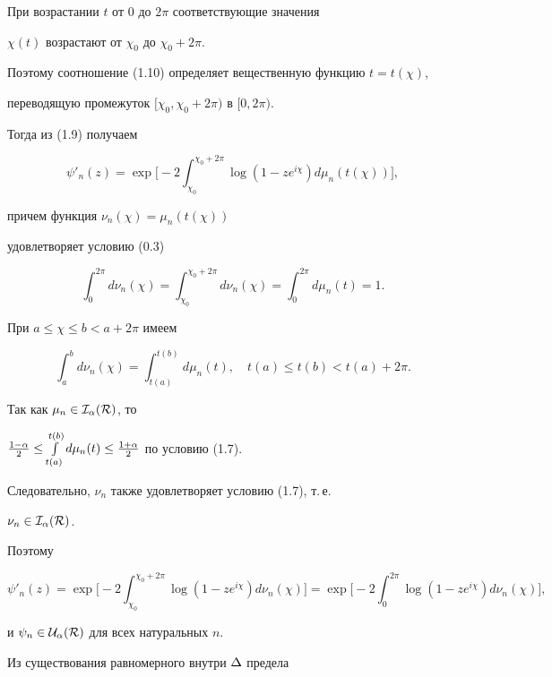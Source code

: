 \begin{pf}
При возрастании $t$ от $0$ до $2\pi$ соответствующие значения


$\chi(t)$ возрастают от $\chi_0$ до $\chi_0+2\pi$.


Поэтому соотношение (1.10) определяет вещественную функцию $t=t(\chi)$,


переводящую промежуток $[\chi_0,\chi_0+2\pi)$ в $[0,2\pi)$.


Тогда из (1.9) получаем


$$


\psi'_n(z)=\exp\bigg[-2\int_{\chi_0}^{\chi_0+2\pi}\log(1-ze^{i\chi})


d\mu_n(t(\chi))\bigg],


$$


причем функция $\nu_n(\chi)=\mu_n(t(\chi))$


удовлетворяет условию (0.3)


$$


\int_0^{2\pi}d\nu_n(\chi)=\int_{\chi_0}^{\chi_0+2\pi}d\nu_n(\chi)=


\int_0^{2\pi}d\mu_n(t)=1.


$$


При $a\le\chi\le b<a+2\pi$ имеем


$$


\int_a^{b}d\nu_n(\chi)=


\int_{t(a)}^{t(b)}d\mu_n(t), \quad t(a)\le


t(b)<t(a)+2\pi.


$$


Так как $\mu_n\in\cal I_\alpha(R)$, то


$\frac{1-\al}{2}\le\int\limits_{t(a)}^{t(b)}d\mu_n(t)


\le\frac{1+\al}{2}$ по условию (1.7).


Следовательно, $\nu_n$ также удовлетворяет условию (1.7), т.\,е.


$\nu_n\in\cal I_\alpha(R)$.


Поэтому


$$


\psi'_n(z)=\exp\bigg[-2\int_{\chi_0}^{\chi_0+2\pi}


\log(1-ze^{i\chi}) d\nu_n(\chi)\bigg]=\exp\bigg[-2\int


_{0}^{2\pi}\log(1-ze^{i\chi}) d\nu_n(\chi)\bigg],


$$


и $\psi_n\in\cal U_\alpha(R)$ для всех натуральных $n$.





Из существования равномерного внутри $\Delta$ предела



\end{pf}
